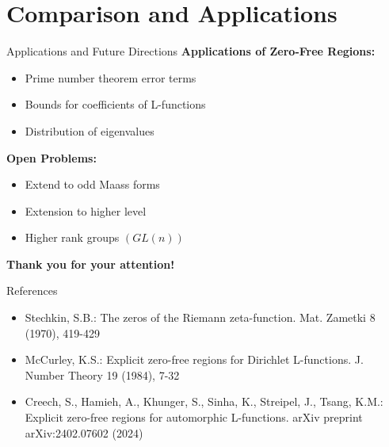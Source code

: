 \documentclass{beamer}
\begin{document}
\section{Comparison and Applications}


\begin{frame}{Applications and Future Directions}
\textbf{Applications of Zero-Free Regions:}
\begin{itemize}
\item Prime number theorem error terms
\item Bounds for coefficients of L-functions
\item Distribution of eigenvalues
\end{itemize}

\vspace{0.5cm}

\textbf{Open Problems:}
\begin{itemize}
\item Extend to odd Maass forms
\item Extension to higher level
\item Higher rank groups $(GL(n))$

\end{itemize}
\end{frame}
\begin{frame}
\begin{center}
\Large \textbf{Thank you for your attention!}
\end{center}
\end{frame}

\begin{frame}{References}
\footnotesize
\begin{itemize}
\item Stechkin, S.B.: The zeros of the Riemann zeta-function. Mat. Zametki 8 (1970), 419-429
\item McCurley, K.S.: Explicit zero-free regions for Dirichlet L-functions. J. Number Theory 19 (1984), 7-32
\item Creech, S., Hamieh, A., Khunger, S., Sinha, K., Streipel, J., Tsang, K.M.: Explicit zero-free regions for automorphic L-functions. arXiv preprint arXiv:2402.07602 (2024)
\end{itemize}
\end{frame}
\end{document}
